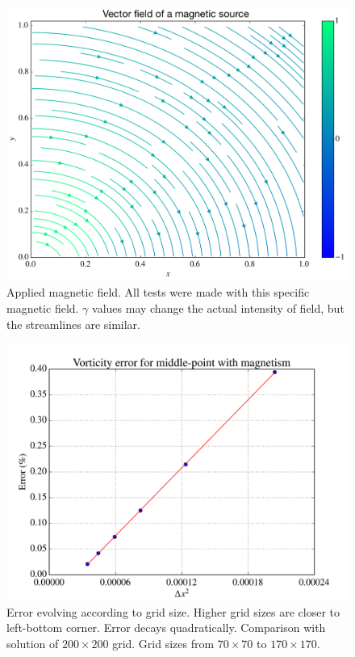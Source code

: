 \documentclass[journal]{IEEEtran}
\begin{document}
\begin{figure}[!t]
\centering
\includegraphics[width=\linewidth]{figures/vectorFieldH}
\caption{Applied magnetic field. All tests were made with this specific magnetic field. $\gamma$ values may change the actual intensity of field, but the streamlines are similar.\label{magneticField}}
\end{figure}


\begin{figure}[!t]
\centering
\includegraphics[width=\linewidth]{figures/validateMagnetismRe40}
\caption{Error evolving according to grid size. Higher grid sizes are closer to left-bottom corner. Error decays quadratically. Comparison with solution of $200\times 200$ grid. Grid sizes from $70\times 70$ to $170\times 170$. \label{magneticTest}}
\end{figure}
\end{document}
